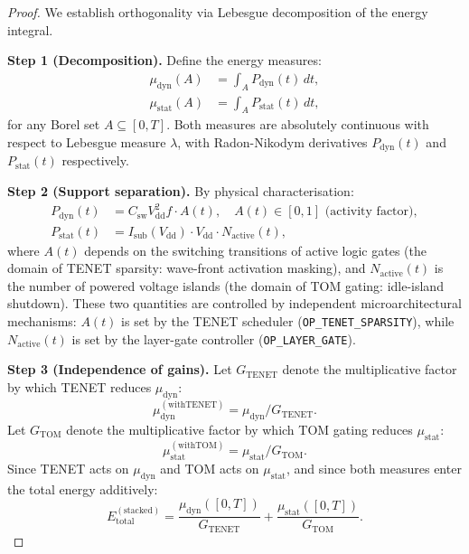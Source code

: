 \begin{proof}
We establish orthogonality via Lebesgue decomposition of the energy integral.

\medskip
\noindent\textbf{Step 1 (Decomposition).}
Define the energy measures:
\begin{align*}
  \mu_{\mathrm{dyn}}(A) &= \int_{A} P_{\mathrm{dyn}}(t)\, dt, \\
  \mu_{\mathrm{stat}}(A) &= \int_{A} P_{\mathrm{stat}}(t)\, dt,
\end{align*}
for any Borel set \(A \subseteq [0,T]\).  Both measures are absolutely
continuous with respect to Lebesgue measure \(\lambda\), with
Radon-Nikodym derivatives \(P_{\mathrm{dyn}}(t)\) and
\(P_{\mathrm{stat}}(t)\) respectively.

\medskip
\noindent\textbf{Step 2 (Support separation).}
By physical characterisation:
\begin{align*}
  P_{\mathrm{dyn}}(t) &= C_{\mathrm{sw}} V_{\mathrm{dd}}^{2} f \cdot A(t),
    \quad A(t) \in [0,1] \text{ (activity factor)}, \\
  P_{\mathrm{stat}}(t) &= I_{\mathrm{sub}}(V_{\mathrm{dd}}) \cdot
    V_{\mathrm{dd}} \cdot N_{\mathrm{active}}(t),
\end{align*}
where \(A(t)\) depends on the switching transitions of active logic gates
(the domain of TENET sparsity: wave-front activation masking), and
\(N_{\mathrm{active}}(t)\) is the number of powered voltage islands
(the domain of TOM gating: idle-island shutdown).  These two quantities
are controlled by independent microarchitectural mechanisms:
\(A(t)\) is set by the TENET scheduler (\texttt{OP\_TENET\_SPARSITY}),
while \(N_{\mathrm{active}}(t)\) is set by the layer-gate controller
(\texttt{OP\_LAYER\_GATE}).

\medskip
\noindent\textbf{Step 3 (Independence of gains).}
Let \(G_{\mathrm{TENET}}\) denote the multiplicative factor by which
TENET reduces \(\mu_{\mathrm{dyn}}\):
\[
  \mu_{\mathrm{dyn}}^{\mathrm{(with TENET)}} = \mu_{\mathrm{dyn}} / G_{\mathrm{TENET}}.
\]
Let \(G_{\mathrm{TOM}}\) denote the multiplicative factor by which
TOM gating reduces \(\mu_{\mathrm{stat}}\):
\[
  \mu_{\mathrm{stat}}^{\mathrm{(with TOM)}} = \mu_{\mathrm{stat}} / G_{\mathrm{TOM}}.
\]
Since TENET acts on \(\mu_{\mathrm{dyn}}\) and TOM acts on
\(\mu_{\mathrm{stat}}\), and since both measures enter the total energy
additively:
\[
  E_{\mathrm{total}}^{\mathrm{(stacked)}} =
  \frac{\mu_{\mathrm{dyn}}([0,T])}{G_{\mathrm{TENET}}} +
  \frac{\mu_{\mathrm{stat}}([0,T])}{G_{\mathrm{TOM}}}.
\]


\end{proof}
